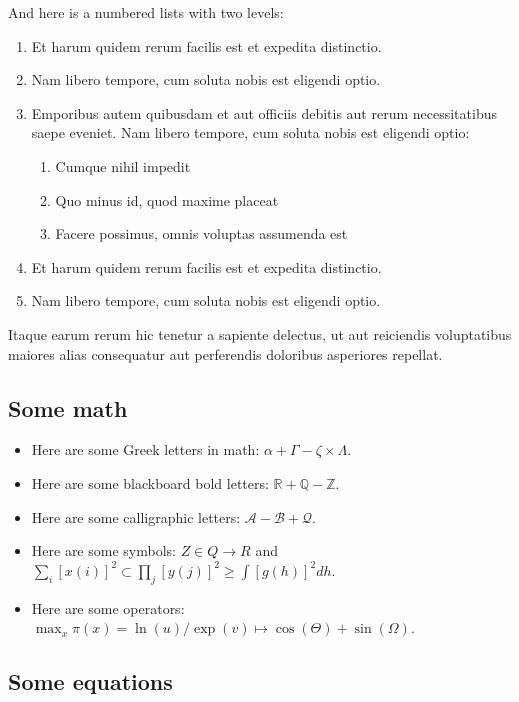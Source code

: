 \documentclass[letterpaper,12pt,leqno]{article}
\begin{document}
And here is a numbered lists with two levels:
\begin{enumerate}
\item Et harum quidem rerum facilis est et expedita distinctio.
\item Nam libero tempore, cum soluta nobis est eligendi optio.
\item Emporibus autem quibusdam et aut officiis debitis aut rerum necessitatibus saepe eveniet. Nam libero tempore, cum soluta nobis est eligendi optio:
\begin{enumerate}
	\item Cumque nihil impedit
	\item Quo minus id, quod maxime placeat
	\item Facere possimus, omnis voluptas assumenda est
\end{enumerate}
\item Et harum quidem rerum facilis est et expedita distinctio.
\item Nam libero tempore, cum soluta nobis est eligendi optio.
\end{enumerate}
Itaque earum rerum hic tenetur a sapiente delectus, ut aut reiciendis voluptatibus maiores alias consequatur aut perferendis doloribus asperiores repellat. 

\subsection{Some math} 

\begin{itemize}
\item Here are some Greek letters in math: $\alpha + \Gamma - \zeta \times \Lambda$.
\item Here are some blackboard bold letters: $\mathbb{R} + \mathbb{Q} - \mathbb{Z}$.
\item Here are some calligraphic letters: $\mathcal{A} - \mathcal{B} + \mathcal{Q}$. 
\item Here are some symbols: $Z \in Q \to R$ and $\sum_i [x(i)]^2 \subset \prod_j [y(j)]^2 \geq \int [g(h)]^2dh $.
\item Here are some operators: $\max_x \pi(x) = \ln(u)/\exp(v) \mapsto \cos(\Theta) + \sin(\Omega)$.
\end{itemize}

\subsection{Some equations} 
\end{document}
